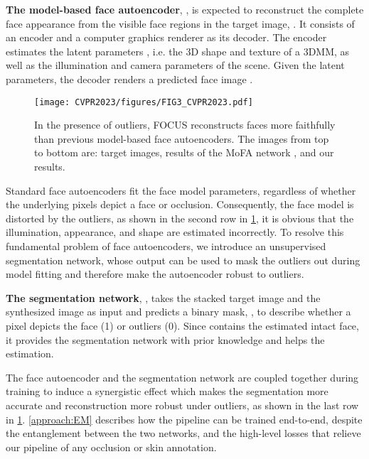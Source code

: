 \documentclass[10pt,twocolumn,letterpaper]{article}
\begin{document}
\textbf{The model-based face autoencoder}, , is expected to reconstruct the complete face appearance from the visible face regions in the target image, . It consists of an encoder and a computer graphics renderer as its decoder. The encoder estimates the latent parameters , i.e. the 3D shape  and texture  of a 3DMM, as well as the illumination  and camera parameters  of the scene. 
Given the latent parameters, the decoder renders a predicted face image .

\begin{figure}[t!]
  \centering
  \texttt{[image: CVPR2023/figures/FIG3\_CVPR2023.pdf]}
  \caption{In the presence of outliers, FOCUS reconstructs faces more faithfully than previous model-based face autoencoders. The images from top to bottom are: target images, results of the MoFA network \cite{tewari2017mofa},
  and our results.}
 \label{fig:OccusionAffectPerformance}
\end{figure}

Standard face autoencoders \cite{tewari2017mofa} fit the face model parameters, regardless of whether the underlying pixels depict a face or occlusion. Consequently, the face model is distorted by the outliers, as shown in the second row in \cref{fig:OccusionAffectPerformance}, it is obvious that the illumination, appearance, and shape are estimated incorrectly.  
To resolve this fundamental problem of face autoencoders, we introduce an unsupervised segmentation network, whose output can be used to mask the outliers out during model fitting and therefore make the autoencoder robust to outliers.

\textbf{The segmentation network}, , takes the stacked target image  and the synthesized image  as input and predicts a binary mask, , to describe whether a pixel depicts the face (1) or outliers (0). Since  contains the estimated intact face, it provides the segmentation network with prior knowledge and helps the estimation.


The face autoencoder and the segmentation network are coupled together during training to induce a synergistic effect which makes the segmentation more accurate and reconstruction more robust under outliers, as shown in the last row in \cref{fig:OccusionAffectPerformance}.
\cref{approach:EM} describes how the pipeline can be trained end-to-end, despite the entanglement between the two networks, and the high-level losses that relieve our pipeline of any occlusion or skin annotation.
\end{document}
